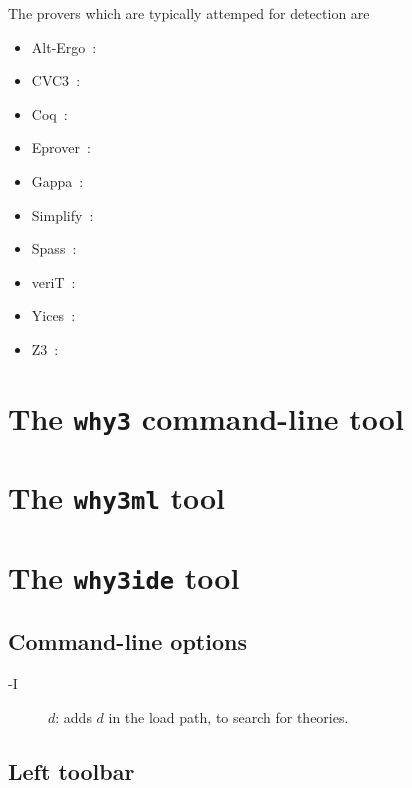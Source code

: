 The provers which are typically attemped for detection are
\begin{itemize}
\item Alt-Ergo~\cite{conchon08smt,ergo}: \url{}
\item CVC3~\cite{BarTin-CAV-07}: \url{}
\item Coq~\cite{CoqArt}: \url{}
\item Eprover~: \url{}
\item Gappa~\cite{melquiond08rnc}: \url{}
\item Simplify~\cite{simplify05}: \url{}
\item Spass~: \url{}
\item veriT~: \url{}
\item Yices~\cite{DM06}: \url{}
\item Z3~\cite{z3}: \url{}
\end{itemize}

\section{The \texttt{why3} command-line tool}
\label{sec:why3ref}

\section{The \texttt{why3ml} tool}

\section{The \texttt{why3ide} tool}
\label{sec:ideref}

\subsection{Command-line options}

\begin{description}
\item[-I] $d$: adds $d$ in the load path, to search for theories.
\end{description}

\subsection{Left toolbar}

